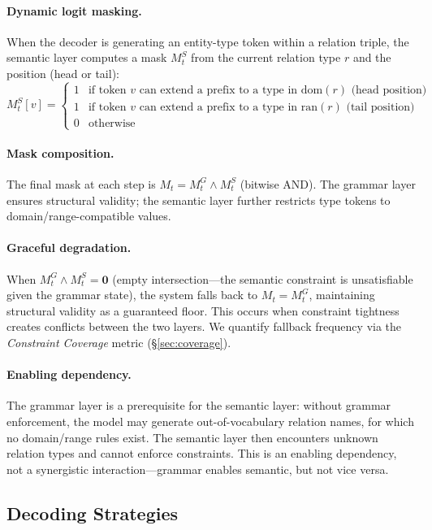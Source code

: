 \documentclass[11pt,a4paper]{article}
\begin{document}
\paragraph{Dynamic logit masking.}
When the decoder is generating an entity-type token within a relation triple, the semantic layer computes a mask $M_t^S$ from the current relation type $r$ and the position (head or tail):
\[
M_t^S[v] = \begin{cases}
1 & \text{if token } v \text{ can extend a prefix to a type in } \text{dom}(r) \text{ (head position)} \\
1 & \text{if token } v \text{ can extend a prefix to a type in } \text{ran}(r) \text{ (tail position)} \\
0 & \text{otherwise}
\end{cases}
\]

\paragraph{Mask composition.}
The final mask at each step is $M_t = M_t^G \wedge M_t^S$ (bitwise AND).
The grammar layer ensures structural validity; the semantic layer further restricts type tokens to domain/range-compatible values.

\paragraph{Graceful degradation.}
When $M_t^G \wedge M_t^S = \mathbf{0}$ (empty intersection---the semantic constraint is unsatisfiable given the grammar state), the system falls back to $M_t = M_t^G$, maintaining structural validity as a guaranteed floor.
This occurs when constraint tightness creates conflicts between the two layers.
We quantify fallback frequency via the \emph{Constraint Coverage} metric (\S\ref{sec:coverage}).

\paragraph{Enabling dependency.}
The grammar layer is a prerequisite for the semantic layer: without grammar enforcement, the model may generate out-of-vocabulary relation names, for which no domain/range rules exist.
The semantic layer then encounters unknown relation types and cannot enforce constraints.
This is an enabling dependency, not a synergistic interaction---grammar enables semantic, but not vice versa.

\subsection{Decoding Strategies}
\end{document}
